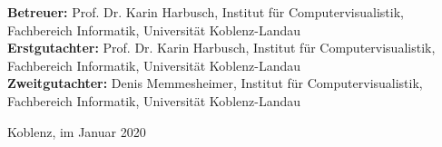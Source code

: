 \documentclass[a4paper, 11pt]{article}
\newcommand{\supervisor}{Prof. Dr. Karin Harbusch} %
\newcommand{\secondSupervisor}{Denis Memmesheimer} %
\begin{document}
\begin{titlepage}
\begin{minipage}[b]{0.8\textwidth}
\begin{flushleft}
\begin{center}
\end{center}

  \footnotesize{
      {\bf Betreuer:} 
	  	\supervisor{}, Institut für Computervisualistik, Fachbereich Informatik, Universität Koblenz-Landau \\
      {\bf Erstgutachter:}   %
	  	\supervisor{}, Institut für Computervisualistik, Fachbereich Informatik, Universität Koblenz-Landau \\
      {\bf Zweitgutachter:}  %
	  	\secondSupervisor{}, Institut für Computervisualistik, Fachbereich Informatik, Universität Koblenz-Landau \\
    
    \vspace{1em}
    \begin{flushleft}
    Koblenz, im Januar 2020
    \end{flushleft}
 }


\end{flushleft}
\end{minipage}

\end{titlepage}
\pagebreak
\end{document}
